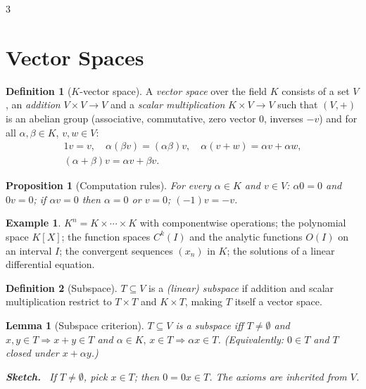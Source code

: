 \documentclass[10pt,a4paper,landscape]{article}
\theoremstyle{definition}
\newtheorem{defn}{Definition}[section]
\newtheorem{exm}{Example}[section]
\theoremstyle{plain}
\newtheorem{lem}{Lemma}[section]
\newtheorem{prop}{Proposition}[section]
\theoremstyle{remark}
\newenvironment{proofsketch}{%
  \par\small\color{exgray}\textbf{Sketch.}\ }%
  {\par}
\begin{document}
\begin{multicols*}{3}

\section{Vector Spaces}

\begin{defn}[$K$-vector space]
A \emph{vector space} over the field $K$ consists of a set $V$, an \emph{addition} $V \times V \to V$ and a \emph{scalar multiplication} $K \times V \to V$ such that $(V,+)$ is an abelian group (associative, commutative, zero vector $0$, inverses $-v$) and for all $\alpha,\beta \in K$, $v,w \in V$:
{\footnotesize\[
\begin{gathered}
1v = v, \quad \alpha(\beta v) = (\alpha\beta)v, \quad \alpha(v+w) = \alpha v + \alpha w,\\
(\alpha+\beta)v = \alpha v + \beta v.
\end{gathered}
\]}
\end{defn}

\begin{prop}[Computation rules]
For every $\alpha \in K$ and $v \in V$: $\alpha 0 = 0$ and $0v = 0$; if $\alpha v = 0$ then $\alpha = 0$ or $v = 0$; $(-1)v = -v$.
\end{prop}

\begin{exm}
$K^n = K \times \cdots \times K$ with componentwise operations; the polynomial space $K[X]$; the function spaces $C^k(I)$ and the analytic functions $O(I)$ on an interval $I$; the convergent sequences $(x_n)$ in $K$; the solutions of a linear differential equation.
\end{exm}

\begin{defn}[Subspace]
$T \subseteq V$ is a \emph{(linear) subspace} if addition and scalar multiplication restrict to $T \times T$ and $K \times T$, making $T$ itself a vector space.
\end{defn}

\begin{lem}[Subspace criterion]
$T \subseteq V$ is a subspace iff $T \neq \emptyset$ and $x,y \in T \Rightarrow x+y \in T$ and $\alpha \in K,\, x \in T \Rightarrow \alpha x \in T$. (Equivalently: $0 \in T$ and $T$ closed under $x + \alpha y$.)
\begin{proofsketch}
If $T \neq \emptyset$, pick $x \in T$; then $0 = 0x \in T$. The axioms are inherited from $V$.
\end{proofsketch}
\end{lem}


\end{multicols*}
\end{document}
